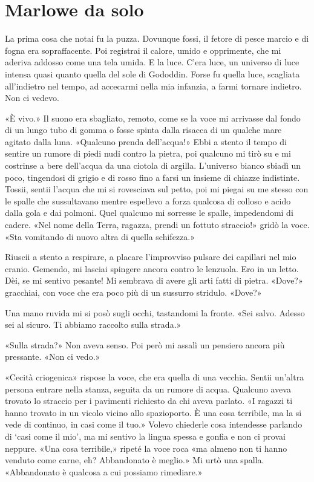 \chapter{Marlowe da solo}

La prima cosa che notai fu la puzza. Dovunque fossi, il fetore di pesce
marcio e di fogna era sopraffacente. Poi registrai il calore, umido e
opprimente, che mi aderiva addosso come una tela umida. E la luce. C'era
luce, un universo di luce intensa quasi quanto quella del sole di
Gododdin. Forse fu quella luce, scagliata all'indietro nel tempo, ad
accecarmi nella mia infanzia, a farmi tornare indietro. Non ci vedevo.

«È vivo.» Il suono era sbagliato, remoto, come se la voce mi arrivasse
dal fondo di un lungo tubo di gomma o fosse spinta dalla risacca di un
qualche mare agitato dalla luna. «Qualcuno prenda dell'acqua!» Ebbi a
stento il tempo di sentire un rumore di piedi nudi contro la pietra, poi
qualcuno mi tirò su e mi costrinse a bere dell'acqua da una ciotola di
argilla. L'universo bianco sbiadì un poco, tingendosi di grigio e di
rosso fino a farsi un insieme di chiazze indistinte. Tossii, sentii
l'acqua che mi si rovesciava sul petto, poi mi piegai su me stesso con
le spalle che sussultavano mentre espellevo a forza qualcosa di colloso
e acido dalla gola e dai polmoni. Quel qualcuno mi sorresse le spalle,
impedendomi di cadere. «Nel nome della Terra, ragazza, prendi un fottuto
straccio!» gridò la voce. «Sta vomitando di nuovo altra di quella
schifezza.»

Riuscii a stento a respirare, a placare l'improvviso pulsare dei
capillari nel mio cranio. Gemendo, mi lasciai spingere ancora contro le
lenzuola. Ero in un letto. Dèi, se mi sentivo pesante! Mi sembrava di
avere gli arti fatti di pietra. «Dove?» gracchiai, con voce che era poco
più di un sussurro stridulo. «Dove?»

Una mano ruvida mi si posò sugli occhi, tastandomi la fronte. «Sei
salvo. Adesso sei al sicuro. Ti abbiamo raccolto sulla strada.»

«Sulla strada?» Non aveva senso. Poi però mi assalì un pensiero ancora
più pressante. «Non ci vedo.»

«Cecità criogenica» rispose la voce, che era quella di una vecchia.
Sentii un'altra persona entrare nella stanza, seguita da un rumore di
acqua. Qualcuno aveva trovato lo straccio per i pavimenti richiesto da
chi aveva parlato. «I ragazzi ti hanno trovato in un vicolo vicino allo
spazioporto. È una cosa terribile, ma la si vede di continuo, in casi
come il tuo.» Volevo chiederle cosa intendesse parlando di `casi come il
mio', ma mi sentivo la lingua spessa e gonfia e non ci provai neppure.
«Una cosa terribile,» ripeté la voce roca «ma almeno non ti hanno
venduto come carne, eh? Abbandonato è meglio.» Mi urtò una spalla.
«Abbandonato è qualcosa a cui possiamo rimediare.»

